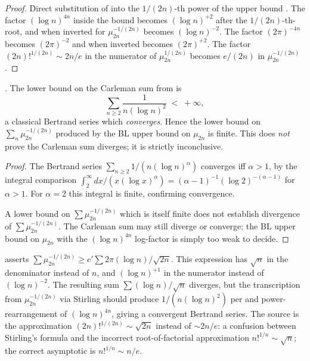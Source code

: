 \begin{proof}
Direct substitution of  into
the \(1/(2n)\)-th power of the upper bound
. The factor \((\log n)^{4n}\)
inside the bound becomes \((\log n)^{+2}\) after the
\(1/(2n)\)-th-root, and when inverted for \(\mu_{2n}^{-1/(2n)}\) becomes
\((\log n)^{-2}\). The factor \((2\pi)^{-4n}\) becomes \((2\pi)^{-2}\)
and when inverted becomes \((2\pi)^{+2}\). The factor
\((2n)!^{1/(2n)}\sim 2n/e\) in the numerator of \(\mu_{2n}^{1/(2n)}\)
becomes \(e/(2n)\) in \(\mu_{2n}^{-1/(2n)}\).
\end{proof}

\begin{corollary}
\label{v4-arith:r-audit:cor:inconclusive}
\ClaimStatusProvedHere. The lower bound on the Carleman sum from
 is
\begin{equation}
\label{v4-arith:r-audit:eq:bertrand}
\sum_{n\geq 2}\frac{1}{n(\log n)^{2}}\;<\;+\infty,
\end{equation}
a classical Bertrand series which \emph{converges}. Hence the
lower bound on \(\sum_{n}\mu_{2n}^{-1/(2n)}\) produced by the BL
upper bound on \(\mu_{2n}\) is finite. This does \emph{not} prove
the Carleman sum diverges; it is strictly inconclusive.
\end{corollary}

\begin{proof}
The Bertrand series \(\sum_{n\geq 2}1/(n(\log n)^{\alpha})\)
converges iff \(\alpha>1\), by the integral comparison
\(\int_{2}^{\infty}dx/(x(\log x)^{\alpha})
=(\alpha-1)^{-1}(\log 2)^{-(\alpha-1)}\) for \(\alpha>1\). For
\(\alpha=2\) this integral is finite, confirming convergence.

A lower bound on \(\sum \mu_{2n}^{-1/(2n)}\) which is itself finite
does not establish divergence of \(\sum \mu_{2n}^{-1/(2n)}\). The
Carleman sum may still diverge or converge; the BL upper bound on
\(\mu_{2n}\) with the \((\log n)^{4n}\) log-factor is simply too
weak to decide.
\end{proof}

\begin{remark}
\label{v4-arith:r-audit:rem:delta-error}
 asserts
\(\sum \mu_{2n}^{-1/(2n)}\geq c'\sum 2\pi(\log n)/\sqrt{2n}\). This
expression has \(\sqrt{n}\) in the denominator instead of \(n\), and
\((\log n)^{+1}\) in the numerator instead of \((\log n)^{-2}\). The
resulting sum \(\sum (\log n)/\sqrt{n}\) diverges, but the
transcription from \(\mu_{2n}^{-1/(2n)}\) via Stirling should
produce \(1/(n(\log n)^{2})\) per 
and power-rearrangement of \((\log n)^{4n}\), giving a convergent
Bertrand series. The source is the approximation
\((2n)!^{1/(2n)}\sim\sqrt{2n}\) instead of \(\sim 2n/e\): a
confusion between Stirling's formula and the incorrect
root-of-factorial approximation \(n!^{1/n}\sim\sqrt{n}\); the
correct asymptotic is \(n!^{1/n}\sim n/e\).
\end{remark}

